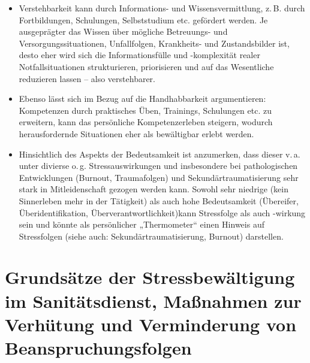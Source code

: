\begin{itemize}
  \item Verstehbarkeit kann durch Informations- und
  Wissensvermittlung, z.\,B. durch Fortbildungen, Schulungen,
  Selbststudium etc. gefördert werden. Je ausgeprägter das
  Wissen über mögliche Betreuungs- und
  Versorgungssituationen, Unfallfolgen, Krankheits- und
  Zustandsbilder ist, desto eher wird sich die
  Informationsfülle und -komplexität realer Notfallsituationen strukturieren,
  priorisieren und auf das Wesentliche reduzieren lassen --
  also verstehbarer.
  
  \item Ebenso lässt sich im Bezug auf die Handhabbarkeit
  argumentieren: Kompetenzen durch praktisches Üben,
  Trainings, Schulungen etc. zu erweitern, kann das
  persönliche Kompetenzerleben steigern, wodurch herausfordernde
  Situationen eher als bewältigbar erlebt werden.
  
  \item Hinsichtlich des Aspekts der Bedeutsamkeit ist
  anzumerken, dass dieser v.\,a. unter divierse o.\,g.
  Stressauswirkungen und insbesondere bei pathologischen
  Entwicklungen (Burnout, Traumafolgen) und
  Sekundärtraumatisierung sehr stark in Mitleidenschaft
  gezogen werden kann. Sowohl sehr niedrige (kein
  Sinnerleben mehr in der Tätigkeit) als auch hohe
  Bedeutsamkeit (Übereifer, Überidentifikation,
  Überverantwortlichkeit)kann Stressfolge als auch -wirkung
  sein und könnte als persönlicher „Thermometer“ einen
  Hinweis auf Stressfolgen (siehe auch:
  Sekundärtraumatisierung, Burnout) darstellen.
\end{itemize}


\section{Grundsätze der Stressbewältigung im Sanitätsdienst, Maßnahmen zur Verhütung und Verminderung von Beanspruchungsfolgen }



